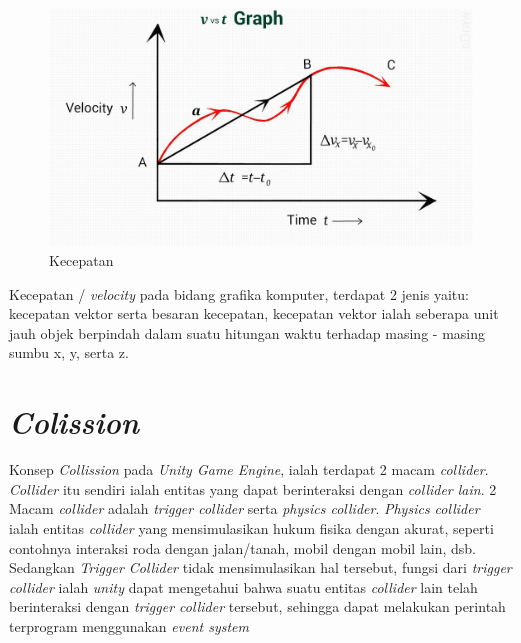 \begin{figure}  [!htb]
	        \captionsetup{justification=centering}
	        \includegraphics[scale=0.2]{img/velocity.jpg}
        	\caption{Kecepatan}
        	\label{fig: 3_27}
\end{figure}

Kecepatan / \textit{velocity} pada bidang grafika komputer, terdapat 2 jenis yaitu: kecepatan vektor serta besaran kecepatan, kecepatan vektor ialah seberapa unit jauh objek berpindah dalam suatu hitungan waktu terhadap masing - masing sumbu x, y, serta z.

\section{\textit{Colission}}
\vspace{1ex}

Konsep \textit{Collission} pada \textit{Unity Game Engine}, ialah terdapat 2 macam \textit{collider}. \textit{Collider} itu sendiri ialah entitas yang dapat berinteraksi dengan \textit{collider lain}. 2 Macam \textit{collider} adalah \textit{trigger collider} serta \textit{physics collider}. \textit{Physics collider} ialah entitas \textit{collider} yang mensimulasikan hukum fisika dengan akurat, seperti contohnya interaksi roda dengan jalan/tanah, mobil dengan mobil lain, dsb. Sedangkan \textit{Trigger Collider} tidak mensimulasikan hal tersebut, fungsi dari \textit{trigger collider} ialah \textit{unity} dapat mengetahui bahwa suatu entitas \textit{collider} lain telah berinteraksi dengan \textit{trigger collider} tersebut, sehingga dapat melakukan perintah terprogram menggunakan \textit{event system}